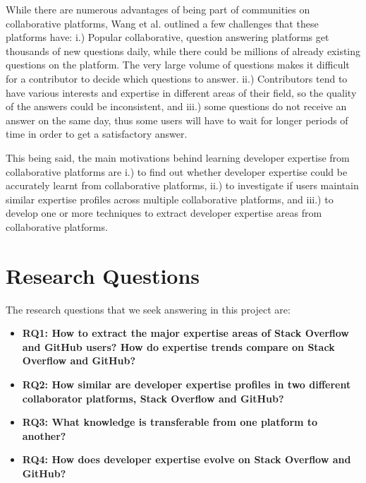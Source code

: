             While there are numerous advantages of being part of communities on collaborative platforms, Wang et al. \cite{wang2018survey} outlined a few challenges that these platforms have: i.) Popular collaborative, question answering platforms get thousands of new questions daily, while there could be millions of already existing questions on the platform. The very large volume of questions makes it difficult for a contributor to decide which questions to answer. ii.) Contributors tend to have various interests and expertise in different areas of their field, so the quality of the answers could be inconsistent, and iii.) some questions do not receive an answer on the same day, thus some users will have to wait for longer periods of time in order to get a satisfactory answer. 
            
            This being said, the main motivations behind learning developer expertise from collaborative platforms are i.) to find out whether developer expertise could be accurately learnt from collaborative platforms, ii.) to investigate if users maintain similar expertise profiles across multiple collaborative platforms, and iii.) to develop one or more techniques to extract developer expertise areas from collaborative platforms.
    
    \section{Research Questions\label{sec:RQs}}
        The research questions that we seek answering in this project are:
    
        \begin{itemize}
            \item \textbf{RQ1: How to extract the major expertise areas of Stack Overflow and GitHub users? How do expertise trends compare on Stack Overflow and GitHub?}
            
            \item \textbf{RQ2: How similar are developer expertise profiles in two different collaborator platforms, Stack Overflow and GitHub?}
            
            \item \textbf{RQ3: What knowledge is transferable from one platform to another?}
            
            \item \textbf{RQ4: How does developer expertise evolve on Stack Overflow and GitHub?}
            
        \end{itemize}
        
